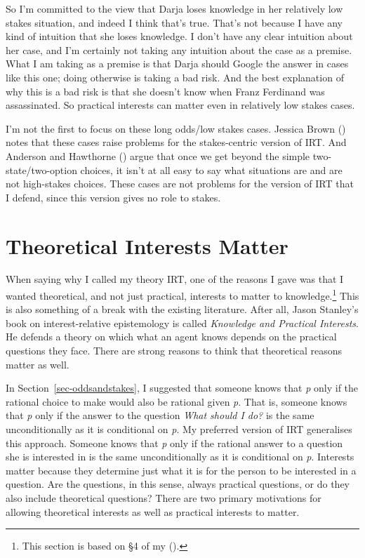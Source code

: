 \documentclass[
  12pt,
  letterpaper,
]{scrbook}
\begin{document}
So I'm committed to the view that Darja loses knowledge in her
relatively low stakes situation, and indeed I think that's true. That's
not because I have any kind of intuition that she loses knowledge. I
don't have any clear intuition about her case, and I'm certainly not
taking any intuition about the case as a premise. What I am taking as a
premise is that Darja should Google the answer in cases like this one;
doing otherwise is taking a bad risk. And the best explanation of why
this is a bad risk is that she doesn't know when Franz Ferdinand was
assassinated. So practical interests can matter even in relatively low
stakes cases.

I'm not the first to focus on these long odds/low stakes cases. Jessica
Brown () notes that these cases raise
problems for the stakes-centric version of IRT. And Anderson and
Hawthorne () argue that once
we get beyond the simple two-state/two-option choices, it isn't at all
easy to say what situations are and are not high-stakes choices. These
cases are not problems for the version of IRT that I defend, since this
version gives no role to stakes.

\section{Theoretical Interests Matter}\label{sec-whatinterests}

When saying why I called my theory IRT, one of the reasons I gave was
that I wanted theoretical, and not just practical, interests to matter
to knowledge.\footnote{This section is based on §4 of my
  ().} This is also something
of a break with the existing literature. After all, Jason Stanley's book
on interest-relative epistemology is called \emph{Knowledge and
Practical Interests}. He defends a theory on which what an agent knows
depends on the practical questions they face. There are strong reasons
to think that theoretical reasons matter as well.

In Section~\ref{sec-oddsandstakes}, I suggested that someone knows that
\emph{p} only if the rational choice to make would also be rational
given \emph{p}. That is, someone knows that \emph{p} only if the answer
to the question \emph{What should I do?} is the same unconditionally as
it is conditional on \emph{p}. My preferred version of IRT generalises
this approach. Someone knows that \emph{p} only if the rational answer
to a question she is interested in is the same unconditionally as it is
conditional on \emph{p}. Interests matter because they determine just
what it is for the person to be interested in a question. Are the
questions, in this sense, always practical questions, or do they also
include theoretical questions? There are two primary motivations for
allowing theoretical interests as well as practical interests to matter.
\end{document}
